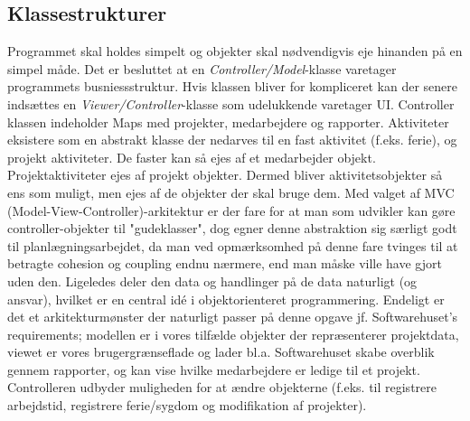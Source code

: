 \subsection{Klassestrukturer} Programmet skal holdes simpelt og objekter skal nødvendigvis eje hinanden på en simpel måde. Det er besluttet at en \emph{Controller/Model}-klasse varetager programmets busniessstruktur. Hvis klassen bliver for kompliceret kan der senere indsættes en \emph{Viewer/Controller}-klasse som udelukkende varetager UI. Controller klassen indeholder Maps med projekter, medarbejdere og rapporter. Aktiviteter eksistere som en abstrakt klasse der nedarves til en fast aktivitet (f.eks. ferie), og projekt aktiviteter. De faster kan så ejes af et medarbejder objekt. Projektaktiviteter ejes af projekt objekter. Dermed bliver aktivitetsobjekter så ens som muligt, men ejes af de objekter der skal bruge dem. Med valget af MVC (Model-View-Controller)-arkitektur er der fare for at man som udvikler kan gøre controller-objekter til "gudeklasser", dog egner denne abstraktion sig særligt godt til planlægningsarbejdet, da man ved opmærksomhed på denne fare tvinges til at betragte cohesion og coupling endnu nærmere, end man måske ville have gjort uden den. Ligeledes deler den data og handlinger på de data naturligt (og ansvar), hvilket er en central idé i objektorienteret programmering. Endeligt er det et arkitekturmønster der naturligt passer på denne opgave jf. Softwarehuset's requirements; modellen er i vores tilfælde objekter der repræsenterer projektdata, viewet er vores brugergrænseflade og lader bl.a. Softwarehuset skabe overblik gennem rapporter, og kan vise hvilke medarbejdere er ledige til et projekt. Controlleren udbyder muligheden for at ændre objekterne (f.eks. til registrere arbejdstid, registrere ferie/sygdom og modifikation af projekter).